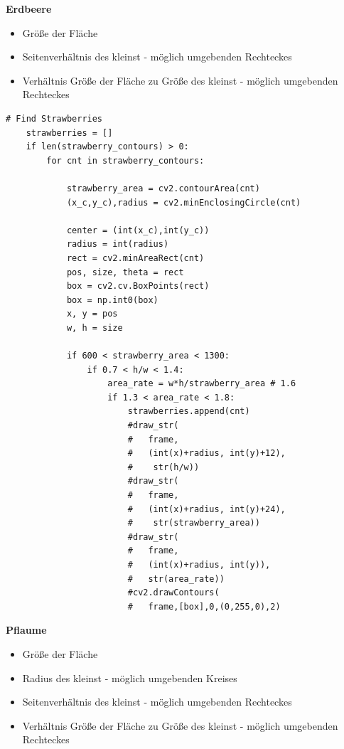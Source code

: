 \textbf{Erdbeere}

\begin{itemize}
    \item Größe der Fläche
    \item Seitenverhältnis des kleinst - möglich umgebenden Rechteckes
    \item Verhältnis Größe der Fläche zu Größe des kleinst - möglich umgebenden Rechteckes
\end{itemize}

\lstset{language=Python}
\begin{lstlisting}[]
# Find Strawberries
    strawberries = []
    if len(strawberry_contours) > 0:
        for cnt in strawberry_contours:

            strawberry_area = cv2.contourArea(cnt)
            (x_c,y_c),radius = cv2.minEnclosingCircle(cnt)

            center = (int(x_c),int(y_c))
            radius = int(radius)
            rect = cv2.minAreaRect(cnt)
            pos, size, theta = rect
            box = cv2.cv.BoxPoints(rect)
            box = np.int0(box)
            x, y = pos
            w, h = size
            
            if 600 < strawberry_area < 1300:
                if 0.7 < h/w < 1.4:
                    area_rate = w*h/strawberry_area # 1.6
                    if 1.3 < area_rate < 1.8:
                        strawberries.append(cnt)
                        #draw_str(
                        #   frame,
                        #   (int(x)+radius, int(y)+12),
                        #    str(h/w))
                        #draw_str(
                        #   frame,
                        #   (int(x)+radius, int(y)+24),
                        #    str(strawberry_area))
                        #draw_str(
                        #   frame,
                        #   (int(x)+radius, int(y)), 
                        #   str(area_rate))
                        #cv2.drawContours(
                        #   frame,[box],0,(0,255,0),2)
\end{lstlisting}
\textbf{Pflaume}

\begin{itemize}
    \item Größe der Fläche
    \item Radius des kleinst - möglich umgebenden Kreises
    \item Seitenverhältnis des kleinst - möglich umgebenden Rechteckes
     \item Verhältnis Größe der Fläche zu Größe des kleinst - möglich umgebenden Rechteckes
\end{itemize}

